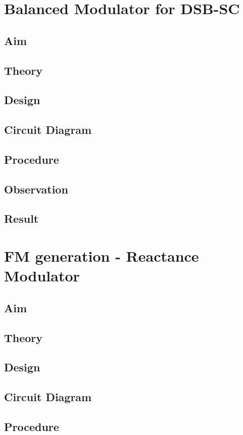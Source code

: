 \documentclass{book}
\begin{document}
\chapter[Balanced Modulator for DSB-SC]{Balanced Modulator for DSB-SC}
\section*{Aim}
\section*{Theory}
\section*{Design}
\section*{Circuit Diagram}
\section*{Procedure}
\section*{Observation}
\section*{Result}


\chapter[FM generation - Reactance Modulator]{FM generation - Reactance Modulator}
\section*{Aim}
\section*{Theory}
\section*{Design}
\section*{Circuit Diagram}
\section*{Procedure}
\end{document}
